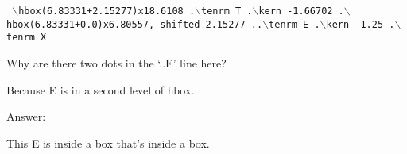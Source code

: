 
{\tt
\obeylines
$\backslash$hbox(6.83331+2.15277)x18.6108
.$\backslash$tenrm T
.$\backslash$kern -1.66702
.$\backslash$hbox(6.83331+0.0)x6.80557, shifted 2.15277
..$\backslash$tenrm E
.$\backslash$kern -1.25
.$\backslash$tenrm X
}

Why are there two dots in the `..\tenrm E' line here?


Because E is in a second level of hbox.


Answer:


This E is inside a box that’s inside a box.

\bye
